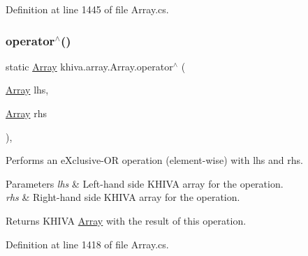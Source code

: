 Definition at line 1445 of file Array.\+cs.

\mbox{\label{classkhiva_1_1array_1_1_array_a9c14257fa56cce75b7c50132d2333bfb}} 
\subsubsection{\texorpdfstring{operator$^\wedge$()}{operator^()}}
{\footnotesize\ttfamily static \mbox{\hyperlink{classkhiva_1_1array_1_1_array}{Array}} khiva.\+array.\+Array.\+operator$^\wedge$ (\begin{DoxyParamCaption}\item[{\mbox{\hyperlink{classkhiva_1_1array_1_1_array}{Array}}}]{lhs,  }\item[{\mbox{\hyperlink{classkhiva_1_1array_1_1_array}{Array}}}]{rhs }\end{DoxyParamCaption})\hspace{0.3cm}{\ttfamily [inline]}, {\ttfamily [static]}}



Performs an e\+Xclusive-\/\+OR operation (element-\/wise) with lhs and rhs. 


\begin{DoxyParams}{Parameters}
{\em lhs} & Left-\/hand side K\+H\+I\+VA array for the operation.\\
\hline
{\em rhs} & Right-\/hand side K\+H\+I\+VA array for the operation.\\
\hline
\end{DoxyParams}
\begin{DoxyReturn}{Returns}
K\+H\+I\+VA \mbox{\hyperlink{classkhiva_1_1array_1_1_array}{Array}} with the result of this operation.
\end{DoxyReturn}


Definition at line 1418 of file Array.\+cs.

\mbox{\label{classkhiva_1_1array_1_1_array_a9afedf82b778a5dd5e57e4a12c6df835}} 
